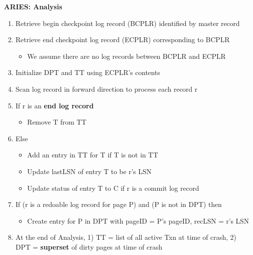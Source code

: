 \documentclass[8pt, landscape]{extarticle}
\begin{document}
\begin{multicols*}{4}
  \textbf{ARIES: Analysis}
  \begin{enumerate}
    \item Retrieve begin checkpoint log record (BCPLR) identified by master record
    \item Retrieve end checkpoint log record (ECPLR) corresponding to BCPLR
    \begin{itemize}
      \item We assume there are no log records between BCPLR and ECPLR
    \end{itemize}
    \item Initialize DPT and TT using ECPLR's contents
    \item Scan log record in forward direction to process each record r
    \item If r is an \textbf{end log record}
    \begin{itemize}
      \item Remove T from TT
    \end{itemize}
    \item Else
    \begin{itemize}
      \item Add an entry in TT for T if T is not in TT
      \item Update lastLSN of entry T to be r's LSN
      \item Update status of entry T to C if r is a commit log record
    \end{itemize}
    \item If (r is a redoable log record for page P) and (P is not in DPT) then
    \begin{itemize}
      \item Create entry for P in DPT with pageID = P's pageID, recLSN = r's LSN
    \end{itemize}
    \item At the end of Analysis, 1) TT = list of all active Txn at time of crash, 2) DPT = \textbf{superset} of dirty pages at time of crash
  \end{enumerate}


\end{multicols*}
\end{document}

